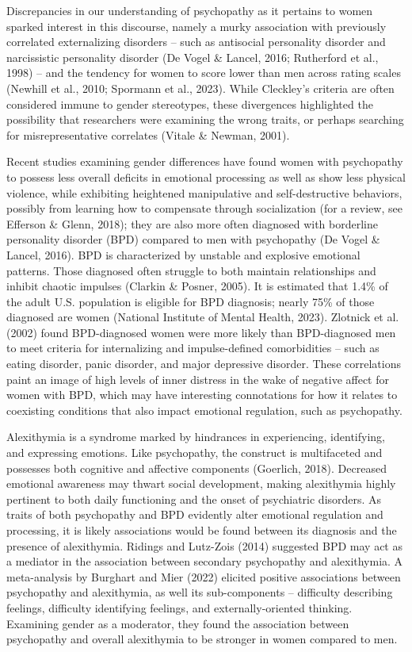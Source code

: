 \documentclass[
  man,floatsintext]{apa7}
\begin{document}
Discrepancies in our understanding of psychopathy as it pertains to women sparked interest in this discourse, namely a murky association with previously correlated externalizing disorders -- such as antisocial personality disorder and narcissistic personality disorder (De Vogel \& Lancel, 2016; Rutherford et al., 1998) -- and the tendency for women to score lower than men across rating scales (Newhill et al., 2010; Spormann et al., 2023). While Cleckley's criteria are often considered immune to gender stereotypes, these divergences highlighted the possibility that researchers were examining the wrong traits, or perhaps searching for misrepresentative correlates (Vitale \& Newman, 2001).

Recent studies examining gender differences have found women with psychopathy to possess less overall deficits in emotional processing as well as show less physical violence, while exhibiting heightened manipulative and self-destructive behaviors, possibly from learning how to compensate through socialization (for a review, see Efferson \& Glenn, 2018); they are also more often diagnosed with borderline personality disorder (BPD) compared to men with psychopathy (De Vogel \& Lancel, 2016). BPD is characterized by unstable and explosive emotional patterns. Those diagnosed often struggle to both maintain relationships and inhibit chaotic impulses (Clarkin \& Posner, 2005). It is estimated that 1.4\% of the adult U.S. population is eligible for BPD diagnosis; nearly 75\% of those diagnosed are women (National Institute of Mental Health, 2023). Zlotnick et al. (2002) found BPD-diagnosed women were more likely than BPD-diagnosed men to meet criteria for internalizing and impulse-defined comorbidities -- such as eating disorder, panic disorder, and major depressive disorder. These correlations paint an image of high levels of inner distress in the wake of negative affect for women with BPD, which may have interesting connotations for how it relates to coexisting conditions that also impact emotional regulation, such as psychopathy.

Alexithymia is a syndrome marked by hindrances in experiencing, identifying, and expressing emotions. Like psychopathy, the construct is multifaceted and possesses both cognitive and affective components (Goerlich, 2018). Decreased emotional awareness may thwart social development, making alexithymia highly pertinent to both daily functioning and the onset of psychiatric disorders. As traits of both psychopathy and BPD evidently alter emotional regulation and processing, it is likely associations would be found between its diagnosis and the presence of alexithymia. Ridings and Lutz-Zois (2014) suggested BPD may act as a mediator in the association between secondary psychopathy and alexithymia. A meta-analysis by Burghart and Mier (2022) elicited positive associations between psychopathy and alexithymia, as well its sub-components -- difficulty describing feelings, difficulty identifying feelings, and externally-oriented thinking. Examining gender as a moderator, they found the association between psychopathy and overall alexithymia to be stronger in women compared to men.
\end{document}
